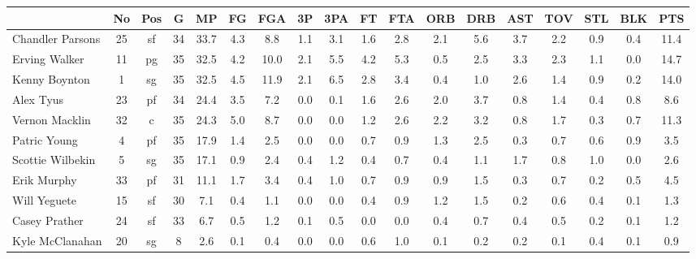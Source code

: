 \documentclass[10pt,letterpaper]{article}
\begin{document}
\begin{table}[ht]
\begin{center}
\begin{tabular}{lccccccccccccccccc}
  \hline
 & No & Pos & G & MP & FG & FGA & 3P & 3PA & FT & FTA & ORB & DRB & AST & TOV & STL & BLK & PTS \\ 
  \hline
Chandler Parsons & 25 & sf & 34 & 33.7 & 4.3 & 8.8 & 1.1 & 3.1 & 1.6 & 2.8 & 2.1 & 5.6 & 3.7 & 2.2 & 0.9 & 0.4 & 11.4 \\ 
  Erving Walker & 11 & pg & 35 & 32.5 & 4.2 & 10.0 & 2.1 & 5.5 & 4.2 & 5.3 & 0.5 & 2.5 & 3.3 & 2.3 & 1.1 & 0.0 & 14.7 \\ 
  Kenny Boynton & 1 & sg & 35 & 32.5 & 4.5 & 11.9 & 2.1 & 6.5 & 2.8 & 3.4 & 0.4 & 1.0 & 2.6 & 1.4 & 0.9 & 0.2 & 14.0 \\ 
  Alex Tyus & 23 & pf & 34 & 24.4 & 3.5 & 7.2 & 0.0 & 0.1 & 1.6 & 2.6 & 2.0 & 3.7 & 0.8 & 1.4 & 0.4 & 0.8 & 8.6 \\ 
  Vernon Macklin & 32 & c & 35 & 24.3 & 5.0 & 8.7 & 0.0 & 0.0 & 1.2 & 2.6 & 2.2 & 3.2 & 0.8 & 1.7 & 0.3 & 0.7 & 11.3 \\ 
  Patric Young & 4 & pf & 35 & 17.9 & 1.4 & 2.5 & 0.0 & 0.0 & 0.7 & 0.9 & 1.3 & 2.5 & 0.3 & 0.7 & 0.6 & 0.9 & 3.5 \\ 
  Scottie Wilbekin & 5 & sg & 35 & 17.1 & 0.9 & 2.4 & 0.4 & 1.2 & 0.4 & 0.7 & 0.4 & 1.1 & 1.7 & 0.8 & 1.0 & 0.0 & 2.6 \\ 
  Erik Murphy & 33 & pf & 31 & 11.1 & 1.7 & 3.4 & 0.4 & 1.0 & 0.7 & 0.9 & 0.9 & 1.5 & 0.3 & 0.7 & 0.2 & 0.5 & 4.5 \\ 
  Will Yeguete & 15 & sf & 30 & 7.1 & 0.4 & 1.1 & 0.0 & 0.0 & 0.4 & 0.9 & 1.2 & 1.5 & 0.2 & 0.6 & 0.4 & 0.1 & 1.3 \\ 
  Casey Prather & 24 & sf & 33 & 6.7 & 0.5 & 1.2 & 0.1 & 0.5 & 0.0 & 0.0 & 0.4 & 0.7 & 0.4 & 0.5 & 0.2 & 0.1 & 1.2 \\ 
  Kyle McClanahan & 20 & sg & 8 & 2.6 & 0.1 & 0.4 & 0.0 & 0.0 & 0.6 & 1.0 & 0.1 & 0.2 & 0.2 & 0.1 & 0.4 & 0.1 & 0.9 \\ 
   \hline
\end{tabular}
\end{center}
\end{table}
\end{document}
